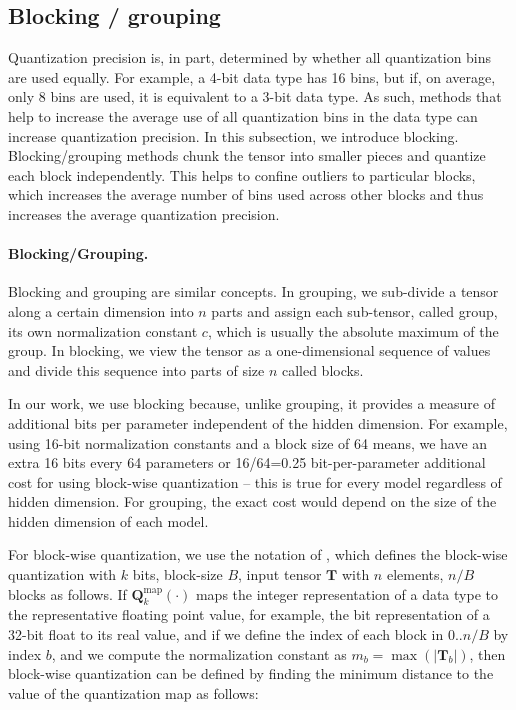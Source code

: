 \subsection{Blocking / grouping }

Quantization precision is, in part, determined by whether all quantization bins are used equally. For example, a 4-bit data type has 16 bins, but if, on average, only 8 bins are used, it is equivalent to a 3-bit data type. As such, methods that help to increase the average use of all quantization bins in the data type can increase quantization precision. In this subsection, we introduce blocking. Blocking/grouping methods chunk the tensor into smaller pieces and quantize each block independently. This helps to confine outliers to particular blocks, which increases the average number of bins used across other blocks and thus increases the average quantization precision. 

\paragraph{Blocking/Grouping.} Blocking and grouping are similar concepts. In grouping, we sub-divide a tensor along a certain dimension into $n$ parts and assign each sub-tensor, called group, its own normalization constant $c$, which is usually the absolute maximum of the group. In blocking, we view the tensor as a one-dimensional sequence of values and divide this sequence into parts of size $n$ called blocks.

In our work, we use blocking because, unlike grouping, it provides a measure of additional bits per parameter independent of the hidden dimension. For example, using 16-bit normalization constants and a block size of 64 means, we have an extra 16 bits every 64 parameters or 16/64=0.25 bit-per-parameter additional cost for using block-wise quantization -- this is true for every model regardless of hidden dimension. For grouping, the exact cost would depend on the size of the hidden dimension of each model. 

For block-wise quantization, we use the notation of \citet{dettmers2022optimizers}, which defines the block-wise quantization with $k$ bits, block-size $B$, input tensor $\mathbf{T}$ with $n$ elements, $n/B$ blocks as follows. If $\mathbf{Q}_k^{\text{map}}(\cdot)$ maps the integer representation of a data type to the representative floating point value, for example, the bit representation of a 32-bit float to its real value, and if we define the index of each block in $0..n/B$ by index $b$, and we compute the normalization constant as $m_b = \max(|\mathbf{T}_b|)$, then block-wise quantization can be defined by finding the minimum distance to the value of the quantization map as follows:

